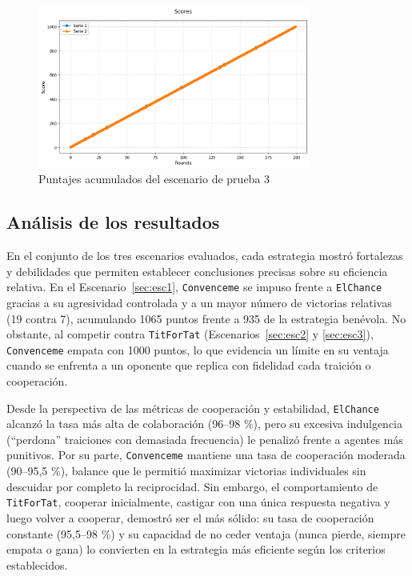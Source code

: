 \documentclass{article}
\begin{document}
\begin{figure}[H]        
  \centering             
  \includegraphics[width=0.8\textwidth]{diagrams/escenario3.png}
  \caption{Puntajes acumulados del escenario de prueba 3}
  \label{fig:scores_essc3}
\end{figure}

\subsection{Análisis de los resultados}

En el conjunto de los tres escenarios evaluados, cada estrategia mostró fortalezas y 
debilidades que permiten establecer conclusiones precisas sobre su eficiencia relativa. 
En el Escenario~\ref{sec:esc1}, \texttt{Convenceme} se impuso frente a \texttt{ElChance} 
gracias a su agresividad controlada y a un mayor número de victorias relativas 
(19 contra 7), acumulando 1065 puntos frente a 935 de la estrategia benévola. 
No obstante, al competir contra \texttt{TitForTat} (Escenarios~\ref{sec:esc2} y \ref{sec:esc3}), 
\texttt{Convenceme} empata con 1000 puntos, 
lo que evidencia un límite en su ventaja cuando se enfrenta a un oponente que 
replica con fidelidad cada traición o cooperación.

Desde la perspectiva de las métricas de cooperación y estabilidad,
\texttt{ElChance} alcanzó la tasa más alta de colaboración 
(96–98 \%), pero su excesiva indulgencia (“perdona” traiciones con demasiada frecuencia) 
le penalizó frente a agentes más punitivos. Por su parte, \texttt{Convenceme} 
mantiene una tasa de cooperación moderada (90–95,5 \%), balance que le permitió maximizar 
victorias individuales sin descuidar por completo la reciprocidad. Sin embargo, el comportamiento 
de \texttt{TitForTat}, cooperar inicialmente, castigar con una única respuesta negativa y 
luego volver a cooperar, demostró ser el más sólido: su tasa de cooperación
 constante (95,5–98 \%) y su capacidad de no ceder ventaja (nunca pierde, siempre empata o gana) 
 lo convierten en la estrategia más eficiente según los criterios establecidos.
\end{document}
